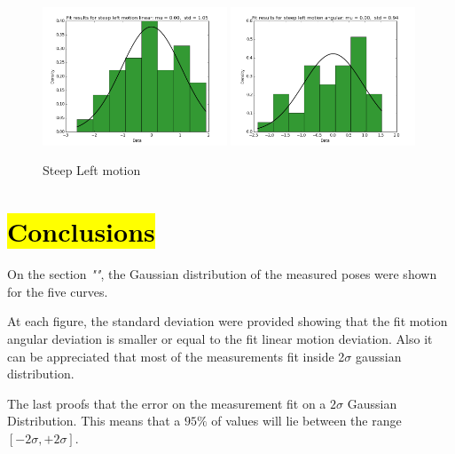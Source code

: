 \documentclass[10pt]{scrartcl}
\begin{document}
\begin{figure}[H]
\centering
\caption{Steep Left motion}
\label{fig:15}
\includegraphics[width=0.49\textwidth ]{images/pca_steep_left_linear_data}
\includegraphics[width=0.49\textwidth]{images/pca_steep_left_angular_data}
\end{figure}

\section*{\hl{Conclusions}}

On the section \textit{""}, the Gaussian distribution of the measured poses were shown for the five curves. 

At each figure, the standard deviation were provided showing that the fit motion angular deviation is smaller or equal to the fit linear motion deviation. Also it can be appreciated that most of the measurements fit inside 2$\sigma$ gaussian distribution.

The last proofs that the error on the measurement fit on a $2\sigma$ Gaussian Distribution. This means that a $95\%$ of values will lie between the range $\left[-2\sigma,+2\sigma\right]$.
\end{document}
